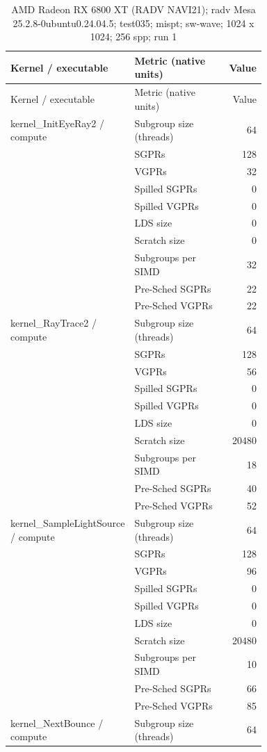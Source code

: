 \begin{longtable}{p{0.30\linewidth}p{0.43\linewidth}r}
\caption{AMD Radeon RX 6800 XT (RADV NAVI21); radv Mesa 25.2.8-0ubuntu0.24.04.5; test035; mispt; sw-wave; 1024 x 1024; 256 spp; run 1}\label{tab:hydra-profile-24}\\
\hline Kernel / executable & Metric (native units) & Value \\\hline
\endfirsthead
\hline Kernel / executable & Metric (native units) & Value \\\hline
\endhead
kernel\_InitEyeRay2 / compute & Subgroup size (threads) & 64 \\
 & SGPRs & 128 \\
 & VGPRs & 32 \\
 & Spilled SGPRs & 0 \\
 & Spilled VGPRs & 0 \\
 & LDS size & 0 \\
 & Scratch size & 0 \\
 & Subgroups per SIMD & 32 \\
 & Pre-Sched SGPRs & 22 \\
 & Pre-Sched VGPRs & 22 \\
\hline
kernel\_RayTrace2 / compute & Subgroup size (threads) & 64 \\
 & SGPRs & 128 \\
 & VGPRs & 56 \\
 & Spilled SGPRs & 0 \\
 & Spilled VGPRs & 0 \\
 & LDS size & 0 \\
 & Scratch size & 20480 \\
 & Subgroups per SIMD & 18 \\
 & Pre-Sched SGPRs & 40 \\
 & Pre-Sched VGPRs & 52 \\
\hline
kernel\_SampleLightSource / compute & Subgroup size (threads) & 64 \\
 & SGPRs & 128 \\
 & VGPRs & 96 \\
 & Spilled SGPRs & 0 \\
 & Spilled VGPRs & 0 \\
 & LDS size & 0 \\
 & Scratch size & 20480 \\
 & Subgroups per SIMD & 10 \\
 & Pre-Sched SGPRs & 66 \\
 & Pre-Sched VGPRs & 85 \\
\hline
kernel\_NextBounce / compute & Subgroup size (threads) & 64 \\

\end{longtable}
